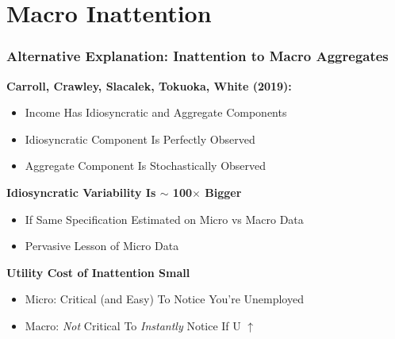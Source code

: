 \documentclass[10pt,english,t,10pt]{beamer}
\newcommand{\jbemph}[1]{\textbf{\color{SlideNavy}#1}}
\begin{document}
\section{Macro Inattention}
\begin{frame}
\frametitle{Alternative Explanation: Inattention to Macro Aggregates}
\jbemph{Carroll, Crawley, Slacalek, Tokuoka, White (2019):}
\begin{itemize}
\item   Income Has Idiosyncratic and Aggregate Components
\item   Idiosyncratic Component Is Perfectly Observed
\item   Aggregate Component Is Stochastically Observed
\end{itemize}

\vfill 
%
%

\pause

\begin{block}{\textbf{Idiosyncratic Variability Is $\sim$ 100$\times$ Bigger}}
\begin{itemize}
\item  If Same Specification Estimated on Micro vs Macro Data
\item  Pervasive Lesson of Micro Data
\end{itemize}
\end{block}

\pause

\begin{block}{\textbf{Utility Cost of Inattention Small}}
\begin{itemize}
\item  Micro: Critical (and Easy) To Notice You're Unemployed

\item  Macro: {\it Not} Critical To {\it Instantly} Notice If U $\uparrow$
\end{itemize}
\end{block}
\end{frame}
\end{document}
